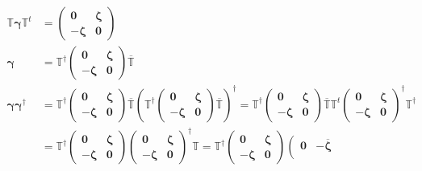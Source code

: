 \documentclass[aps, preprint]{revtex4}
\begin{document}
\begin{align}\mathbb{T} \mathbf{\gamma } \mathbb{T}^{t} &  =\left (\begin{array}{cc}\mathbf{0} & \mathbf{\zeta } \\
 -\mathbf{\zeta } & \mathbf{0}\end{array}\right ) \\
\mathbf{\gamma } &  =\mathbb{T}^{ \dag } \left (\begin{array}{cc}\mathbf{0} & \mathbf{\zeta } \\
 -\mathbf{\zeta } & \mathbf{0}\end{array}\right ) \overline{\mathbb{T}} \\
\mathbf{\gamma } \mathbf{\gamma }^{ \dag } &  =\mathbb{T}^{ \dag } \left (\begin{array}{cc}\mathbf{0} & \mathbf{\zeta } \\
 -\mathbf{\zeta } & \mathbf{0}\end{array}\right ) \overline{\mathbb{T}} \left (\mathbb{T}^{ \dag } \left (\begin{array}{cc}\mathbf{0} & \mathbf{\zeta } \\
 -\mathbf{\zeta } & \mathbf{0}\end{array}\right ) \overline{\mathbb{T}}\right )^{ \dag } =\mathbb{T}^{ \dag } \left (\begin{array}{cc}\mathbf{0} & \mathbf{\zeta } \\
 -\mathbf{\zeta } & \mathbf{0}\end{array}\right ) \overline{\mathbb{T}} \mathbb{T}^{t} \left (\begin{array}{cc}\mathbf{0} & \mathbf{\zeta } \\
 -\mathbf{\zeta } & \mathbf{0}\end{array}\right )^{ \dag } \mathbb{T}^{ \dag } \\
 &  =\mathbb{T}^{ \dag } \left (\begin{array}{cc}\mathbf{0} & \mathbf{\zeta } \\
 -\mathbf{\zeta } & \mathbf{0}\end{array}\right ) \left (\begin{array}{cc}\mathbf{0} & \mathbf{\zeta } \\
 -\mathbf{\zeta } & \mathbf{0}\end{array}\right )^{ \dag } \mathbb{T} =\mathbb{T}^{ \dag } \left (\begin{array}{cc}\mathbf{0} & \mathbf{\zeta } \\
 -\mathbf{\zeta } & \mathbf{0}\end{array}\right ) \left (\begin{array}{cc}\mathbf{0} &  -\overline{\mathbf{\zeta }} \\

\end{array}
\end{align}
\end{document}
